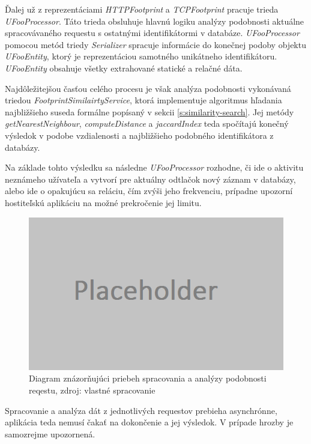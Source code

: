 \documentclass[
  digital, %
  table,   %
  lof,     %
  nolot,   %
  nocover
]{fithesis3}
\begin{document}
Ďalej už z reprezentáciami \textit{HTTPFootprint} a \textit{TCPFootprint}
pracuje trieda \textit{UFooProcessor}. Táto trieda obsluhuje hlavnú logiku
analýzy podobnosti aktuálne spracovávaného requestu s ostatnými identifikátormi
v databáze. \textit{UFooProcessor} pomocou metód triedy \textit{Serializer} spracuje informácie do
konečnej podoby objektu \textit{UFooEntity}, ktorý je reprezentáciou samotného
unikátneho identifikátoru. \textit{UFooEntity} obsahuje všetky extrahované
statické a relačné dáta.

Najdôležitejšou časťou celého procesu je však analýza podobnosti vykonávaná triedou
\textit{FootprintSimilairtyService}, ktorá implementuje algoritmus hľadania
najbližšieho suseda formálne popísaný v sekcii \ref{s:similarity-search}. Jej
metódy \textit{getNearestNeighbour},  \textit{computeDistance} a
\textit{jaccardIndex} teda spočítajú konečný výsledok v podobe vzdialenosti a
najbližšieho podobného identifikátora z databázy.

Na základe tohto výsledku sa následne \textit{UFooProcessor} rozhodne, či ide o
aktivitu neznámeho užívateľa a vytvorí pre aktuálny odtlačok nový záznam v
databázy, alebo ide o opakujúcu sa reláciu, čím zvýši jeho frekvenciu, prípadne
upozorní hostiteľskú aplikáciu na možné prekročenie jej limitu.

\begin{figure}[h]
  \centering
    \includegraphics[width=.99\textwidth]{images/footprint-impl-flow.png}
  \caption{Diagram znázorňujúci priebeh spracovania a analýzy podobnosti
   reqestu, zdroj: vlastné spracovanie}
  \label{fig:footprint-impl-flow}
\end{figure}

Spracovanie a analýza dát z jednotlivých requestov prebieha asynchrónne,
aplikácia teda nemusí čakať na dokončenie a jej výsledok. V prípade hrozby je
samozrejme upozornená. 
\end{document}
